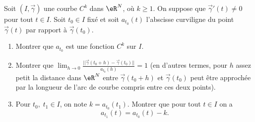 \begin{exercice}\label{exoCourbesSurfaces0011}

Soit $(I, \vec{\gamma})$ une courbe $ C^k$ dans $ \eR^N$, où $ k \geq 1$.  On suppose que $ \vec{\gamma}'(t) \neq 0$ pour tout $ t \in I$.  Soit $ t_0 \in I$ fixé et soit $ a_{t_0}(t) $ l'abscisse curviligne du point $\vec{\gamma}(t)$ par rapport à $\vec{\gamma}(t_0)$.

\begin{enumerate}
	\item
 Montrer que $a_{t_0} $ est une fonction $C^k$ sur $I$. 

\item

 Montrer que $\displaystyle \lim_{h \to 0} \frac{||\vec{\gamma}(t_0 + h) - \vec{\gamma}(t_0)||}{a_{t_0}(h) } = 1$
(en d'autres termes, pour $h$ assez petit la distance dans $\eR^N$ 
entre $ \vec{\gamma}(t_0 + h) $ et $ \vec{\gamma}(t_0)$ 
peut être approchée par la longueur de l'arc de courbe compris entre ces deux points).

\item
 Pour $ t_0, \; t_1 \in I$, on note $ k =a_{t_0}(t_1) $.  Montrer que pour tout $ t \in I$ on a 
 \begin{equation}
	a_{t_1}(t) = a_{t_0}(t) - k.
 \end{equation}
		
\end{enumerate}


\end{exercice}
